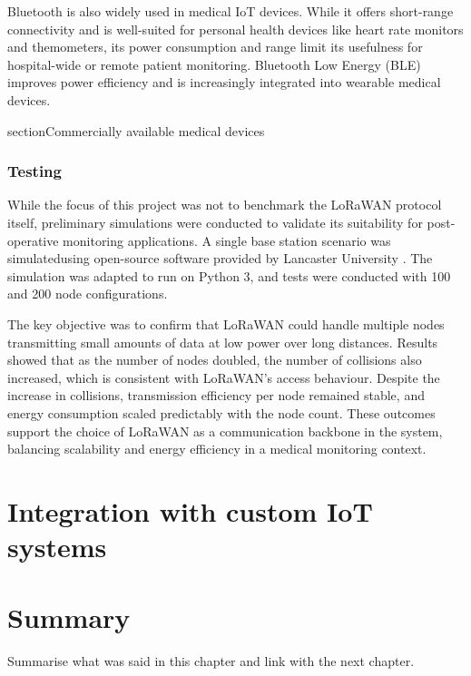 Bluetooth is also widely used in medical IoT devices. While it offers short-range connectivity and is well-suited for personal health devices like heart rate monitors and themometers, its power consumption and range limit its usefulness for hospital-wide or remote patient monitoring. Bluetooth Low Energy (BLE) improves power efficiency and is increasingly integrated into wearable medical devices.

section{Commercially available medical devices} %

\subsubsection{Testing}
While the focus of this project was not to benchmark the LoRaWAN protocol itself, preliminary simulations were conducted to validate its suitability for post-operative monitoring applications. A single base station scenario was simulatedusing open-source software provided by Lancaster University \cite{lancaster_uk_simulation_software}. The simulation was adapted to run on Python 3, and tests were conducted with 100 and 200 node configurations.

The key objective was to confirm that LoRaWAN could handle multiple nodes transmitting small amounts of data at low power over long distances. Results showed that as the number of nodes doubled, the number of collisions also increased, which is consistent with LoRaWAN's access behaviour. Despite the increase in collisions, transmission efficiency per node remained stable, and energy consumption scaled predictably with the node count. These outcomes support the choice of LoRaWAN as a communication backbone in the system, balancing scalability and energy efficiency in a medical monitoring context.

\section{Integration with custom IoT systems} %
\section{Summary} %
Summarise what was said in this chapter and link with the next chapter.
